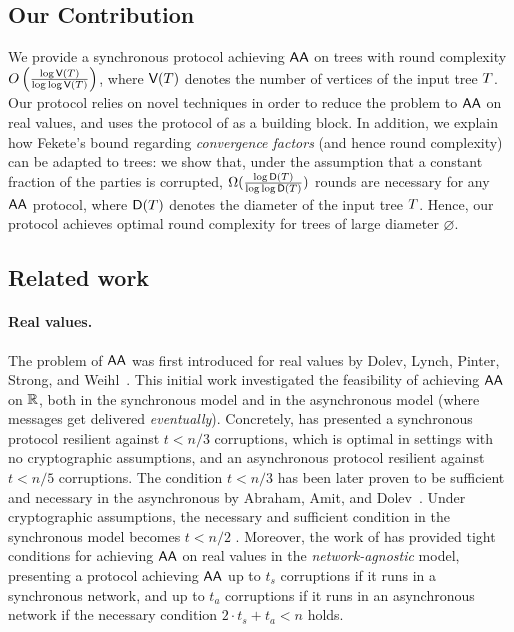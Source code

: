 \subsection{Our Contribution}
We provide a synchronous protocol achieving $\textsf{AA}$ on trees with round complexity $O\left( \frac{ \log \textsf{V}(T) }{\log \log \textsf{V}(T)} \right)$, where $\textsf{V}(T)$ denotes the number of vertices of the input tree $T$. Our protocol relies on novel techniques in order to reduce the problem to $\textsf{AA}$ on real values, and uses the protocol of \cite{BenDoHo10} as a building block.
In addition, we explain how Fekete's bound regarding \emph{convergence factors} (and hence round complexity) can be adapted to trees: we show that, under the assumption that a constant fraction of the parties is corrupted, 
$\Omega(\frac{\log \textsf{D}(T)}{\log \log \textsf{D}(T)})$ rounds are necessary for any $\textsf{AA}$ protocol, where $\textsf{D}(T)$ denotes the diameter of the input tree $T$.
Hence, our protocol achieves optimal round complexity for trees of large diameter $\diameter$.



\subsection{Related work}
\paragraph{Real values.}
The problem of $\textsf{AA}$ was first introduced for real values by Dolev, Lynch, Pinter, Strong, and Weihl~\cite{JACM:DLPSW86}. This initial work investigated the feasibility of achieving $\textsf{AA}$ on $\mathbb{R}$, both in the synchronous model and in the asynchronous model (where messages get delivered \emph{eventually}). Concretely, \cite{JACM:DLPSW86} has presented a synchronous protocol resilient against $t < n / 3$ corruptions, which is optimal in settings with no cryptographic assumptions, and an asynchronous protocol resilient against $t < n/5$ corruptions. The condition $t < n / 3$ has been later proven to be sufficient and necessary in the asynchronous by Abraham, Amit, and Dolev~\cite{OPODIS:AAD04}. Under cryptographic assumptions, the necessary and sufficient condition in the synchronous model becomes $t < n / 2$ \cite{PODC:GhLiWa22, PODC:LenLos22}. Moreover, the work of \cite{PODC:GhLiWa22} has provided tight conditions for achieving $\textsf{AA}$ on real values in the \emph{network-agnostic} model, presenting a protocol achieving $\textsf{AA}$ up to $t_s$ corruptions if it runs in a synchronous network, and up to $t_a$ corruptions if it runs in an asynchronous network if the necessary condition $2 \cdot t_s + t_a < n$ holds.

